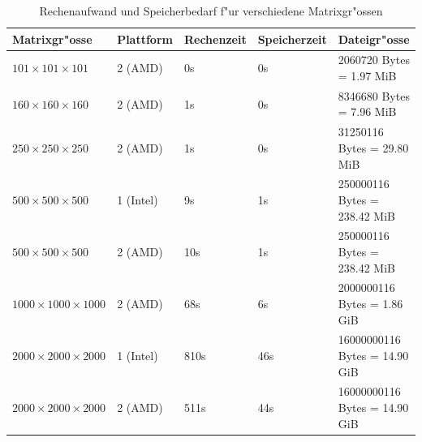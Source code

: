 \begin{refsection}
\begin{table}[ht]
\begin{tabular}{|l|l|l|l|l|}
				\hline
				Matrixgr"osse & 	Plattform & Rechenzeit & Speicherzeit & Dateigr"osse \\ \hline
				$101\times 101\times 101$ & 2 (AMD) & 0s & 0s & 2060720 Bytes = 1.97 MiB \\ \hline
				$160\times 160\times 160$ & 2 (AMD) & 1s & 0s & 8346680 Bytes = 7.96 MiB \\ \hline
				$250\times 250\times 250$ & 2 (AMD) & 1s & 0s & 31250116 Bytes = 29.80 MiB \\ \hline
				$500\times 500\times 500$ & 1 (Intel) & 9s & 1s & 250000116 Bytes = 238.42 MiB \\ \hline
				$500\times 500\times 500$ & 2 (AMD) & 10s & 1s & 250000116 Bytes = 238.42 MiB \\ \hline
				$1000\times 1000\times 1000$ & 2 (AMD) & 68s & 6s & 2000000116 Bytes = 1.86 GiB \\ \hline
				$2000\times 2000\times 2000$ & 1 (Intel) & 810s & 46s & 16000000116 Bytes = 14.90 GiB \\ \hline
				$2000\times 2000\times 2000$ & 2 (AMD) & 511s & 44s & 16000000116 Bytes = 14.90 GiB \\ \hline
			\end{tabular}
			\caption{Rechenaufwand und Speicherbedarf f"ur verschiedene Matrixgr"ossen}
			\label{aufwandstatistik}
		\end{table}


\end{refsection}
